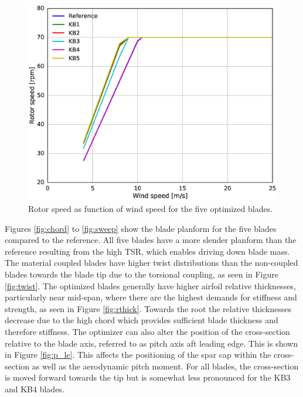 \begin{figure}[pht]
\begin{center}
	\includegraphics[width=.85\linewidth]{figures/KBcomp_rpm.eps}
\end{center}
\caption{Rotor speed as function of wind speed for the five optimized blades.}
\label{fig:rpm}
\end{figure}

\clearpage

Figures \ref{fig:chord} to \ref{fig:sweep} show the blade planform for the five blades compared to the reference.
All five blades have a more slender planform than the reference resulting from the high TSR, which enables driving down blade mass.
The material coupled blades have higher twist distributions than the non-coupled blades towards the blade tip due to the torsional coupling, as seen in Figure \ref{fig:twist}. 
The optimized blades generally have higher airfoil relative thicknesses, particularly near mid-span, where there are the highest demands for stiffness and strength, as seen in Figure \ref{fig:rthick}. Towards the root the relative thicknesses decrease due to the high chord which provides sufficient blade thickness and therefore stiffness.
The optimizer can also alter the position of the cross-section relative to the blade axis, referred to as pitch axis aft leading edge. This is shown in Figure \ref{fig:p_le}. This affects the positioning of the spar cap within the cross-section as well as the aerodynamic pitch moment.
For all blades, the cross-section is moved forward towards the tip but is somewhat less pronounced for the KB3 and KB4 blades. 

